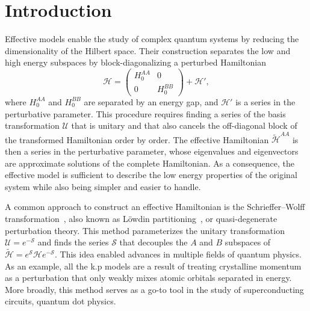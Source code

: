 \section{Introduction}

Effective models enable the study of complex quantum systems by reducing the
dimensionality of the Hilbert space.
Their construction separates the low and high energy subspaces by
block-diagonalizing a perturbed Hamiltonian
%
\begin{equation}
    \mathcal{H} = \begin{pmatrix}H_0^{AA} & 0 \\ 0 & H_0^{BB}\end{pmatrix} + \mathcal{H}',
\end{equation}
%
where $H_0^{AA}$ and $H_0^{BB}$ are separated by an energy gap, and
$\mathcal{H}'$ is a series in the perturbative parameter.
This procedure requires finding a series of the basis transformation
$\mathcal{U}$ that is unitary and that also cancels the off-diagonal block of
the transformed Hamiltonian order by order.
The effective Hamiltonian $\tilde{\mathcal{H}}^{AA}$ is then a series in the
perturbative parameter, whose eigenvalues and eigenvectors are approximate
solutions of the complete Hamiltonian.
As a consequence, the effective model is sufficient to describe the low energy
properties of the original system while also being simpler and easier to
handle.

A common approach to construct an effective Hamiltonian is the
Schrieffer--Wolff transformation~\cite{Schrieffer_1966,Bravyi_2011}, also known
as Löwdin partitioning~\cite{White_1950}, or quasi-degenerate perturbation
theory.
This method parameterizes the unitary transformation $\mathcal{U} =
e^{-\mathcal{S}}$ and finds the series $\mathcal{S}$ that decouples the $A$ and
$B$ subspaces of $\tilde{\mathcal{H}} =
e^{\mathcal{S}}\mathcal{H}e^{-\mathcal{S}}$.
This idea enabled advances in multiple fields of quantum physics.
As an example, all the k.p models are a result of treating crystalline momentum
as a perturbation that only weakly mixes atomic orbitals separated in energy.
More broadly, this method serves as a go-to tool in the study of
superconducting circuits, quantum dot physics. 

